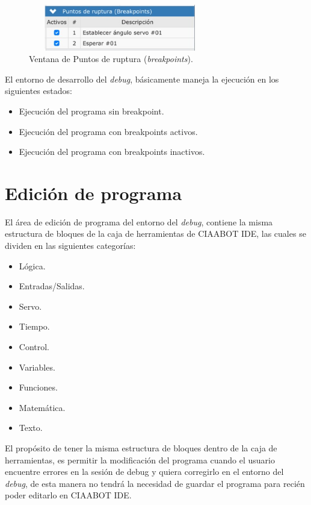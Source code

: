 \begin{figure}[!htbp]
	\centering
	\includegraphics*[width=8cm,height=2cm]{./Figures/ventana.PNG}
	\caption{Ventana de Puntos de ruptura (\emph{breakpoints}).}
	\par\label{fig:ventana}
\end{figure}

El entorno de desarrollo del \emph{debug}, básicamente maneja la ejecución en los siguientes estados:

\begin{itemize}
	\item Ejecución del programa sin breakpoint.
	\item Ejecución del programa con breakpoints activos.	
	\item Ejecución del programa con breakpoints inactivos.
\end{itemize}


\section{Edición de programa}
\label{sec:Edición de programa}

El área de edición de programa del entorno del \emph{debug}, contiene la misma estructura de bloques de la caja de herramientas de CIAABOT IDE, las cuales se dividen en las siguientes categorías:

\begin{itemize}
	\item Lógica.
	\item Entradas/Salidas.	
	\item Servo.
	\item Tiempo.
	\item Control.
	\item Variables.
	\item Funciones.
	\item Matemática.
	\item Texto.
\end{itemize}

El propósito de tener la misma estructura de bloques dentro de la caja de herramientas, es permitir la modificación del programa cuando el usuario encuentre errores en la sesión de debug y quiera corregirlo en el entorno del \emph{debug}, de esta manera no tendrá la necesidad de guardar el programa para recién poder editarlo en CIAABOT IDE.


